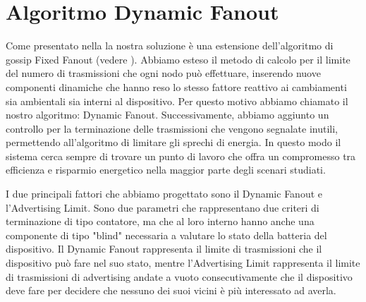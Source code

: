 \section{Algoritmo Dynamic Fanout}
Come presentato nella  la nostra soluzione è una estensione dell'algoritmo di gossip Fixed Fanout (vedere ). Abbiamo esteso il metodo di calcolo per il limite del numero di trasmissioni che ogni nodo può effettuare, inserendo nuove componenti dinamiche che hanno reso lo stesso fattore reattivo ai cambiamenti sia ambientali sia interni al dispositivo. Per questo motivo abbiamo chiamato il nostro algoritmo: Dynamic Fanout. Successivamente, abbiamo aggiunto un controllo per la terminazione delle trasmissioni che vengono segnalate inutili, permettendo all'algoritmo di limitare gli sprechi di energia. In questo modo il sistema cerca sempre di trovare un punto di lavoro che offra un compromesso tra efficienza e risparmio energetico nella maggior parte degli scenari studiati.

I due principali fattori che abbiamo progettato sono il Dynamic Fanout e l'Advertising Limit. Sono due parametri che rappresentano due criteri di terminazione di tipo contatore, ma che al loro interno hanno anche una componente di tipo "blind" necessaria a valutare lo stato della batteria del dispositivo. Il Dynamic Fanout rappresenta il limite di trasmissioni che il dispositivo può fare nel suo stato, mentre l'Advertising Limit rappresenta il limite di trasmissioni di advertising andate a vuoto consecutivamente che il dispositivo deve fare per decidere che nessuno dei suoi vicini è più interessato ad averla.

